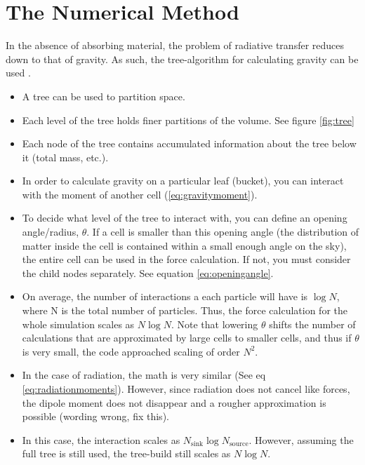 \pagestyle{fancy}
\headheight 20pt
\chead{}
\lfoot{}
\cfoot{\thepage}
\rfoot{}
\renewcommand{\headrulewidth}{0.1pt}
\renewcommand{\footrulewidth}{0.1pt}

\chapter{The Numerical Method}
\label{chap:method}
\thispagestyle{fancy}

In the absence of absorbing material, the problem of radiative transfer reduces down to that of gravity. As such, the tree-algorithm for calculating gravity can be used \citep{barnesHut86}.

\begin{itemize}
\item A tree can be used to partition space.
\item Each level of the tree holds finer partitions of the volume. See figure \ref{fig:tree}
\item Each node of the tree contains accumulated information about the tree below it (total mass, etc.).
\item In order to calculate gravity on a particular leaf (bucket), you can interact with the moment of another cell (\ref{eq:gravitymoment}).
\item To decide what level of the tree to interact with, you can define an opening angle/radius, $\theta$. If a cell is smaller than this opening angle (the distribution of matter inside the cell is contained within a small enough angle on the sky), the entire cell can be used in the force calculation. If not, you must consider the child nodes separately. See equation \ref{eq:openingangle}.
\item On average, the number of interactions a each particle will have is $\log{N}$, where N is the total number of particles. Thus, the force calculation for the whole simulation scales as $N\log{N}$. Note that lowering $\theta$ shifts the number of calculations that are approximated by large cells to smaller cells, and thus if $\theta$ is very small, the code approached scaling of order $N^2$.
\item In the case of radiation, the math is very similar (See eq \ref{eq:radiationmoments}). However, since radiation does not cancel like forces, the dipole moment does not disappear and a rougher approximation is possible (wording wrong, fix this).
\item In this case, the interaction scales as $N_{\mbox{sink}}\log{N_{\mbox{source}}}$. However, assuming the full tree is still used, the tree-build still scales as $N\log{N}$.
\end{itemize}

